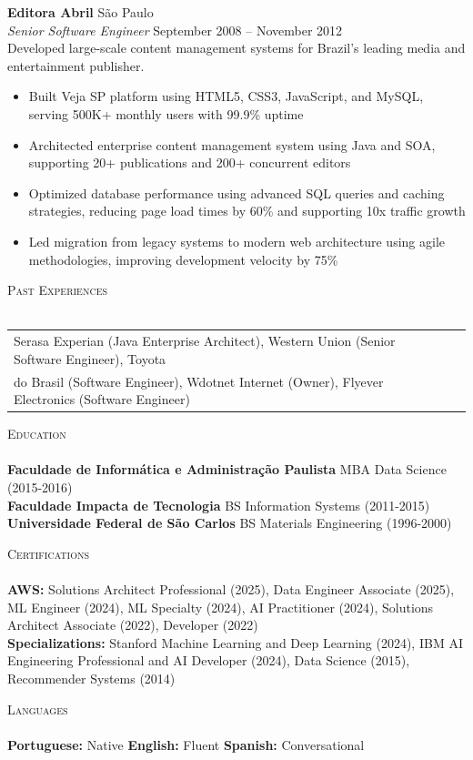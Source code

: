 \documentclass[a4paper]{article}
\newcommand{\lineunder} {
    \vspace*{-8pt} \\
    \hspace*{-18pt} \hrulefill \\
}
\newcommand{\header} [1] {
    {\hspace*{-18pt}\vspace*{6pt} \textsc{#1}}
    \vspace*{-6pt} \lineunder
}
\begin{document}
\textbf{Editora Abril} \hfill São Paulo\\
\textit{Senior Software Engineer} \hfill September 2008 – November 2012\\
\vspace{0.5mm}
Developed large-scale content management systems for Brazil's leading media and entertainment publisher.
\vspace{-2mm}
\begin{itemize}
\setlength\itemsep{-1mm}
\item Built Veja SP platform using HTML5, CSS3, JavaScript, and MySQL, serving 500K+ monthly users with 99.9\% uptime
\item Architected enterprise content management system using Java and SOA, supporting 20+ publications and 200+ concurrent editors
\item Optimized database performance using advanced SQL queries and caching strategies, reducing page load times by 60\% and supporting 10x traffic growth
\item Led migration from legacy systems to modern web architecture using agile methodologies, improving development velocity by 75\%
\end{itemize}
\vspace{0.5mm}

\header{Past Experiences}
\vspace{0.5mm}
\begin{tabular}{ @{}l l }
    Serasa Experian (Java Enterprise Architect), Western Union (Senior Software Engineer), Toyota \\ do Brasil (Software Engineer), Wdotnet Internet (Owner), Flyever Electronics (Software Engineer)
\end{tabular}
\vspace{1mm}

\header{Education}
\vspace{0.5mm}
\textbf{Faculdade de Informática e Administração Paulista} \hfill MBA Data Science (2015-2016) \\
\textbf{Faculdade Impacta de Tecnologia} \hfill BS Information Systems (2011-2015) \\
\textbf{Universidade Federal de São Carlos} \hfill BS Materials Engineering (1996-2000) \\
\vspace{1mm}

\header{Certifications}
\vspace{0.5mm}
\textbf{AWS:} Solutions Architect Professional (2025), Data Engineer Associate (2025), ML Engineer (2024), ML Specialty (2024), AI Practitioner (2024), Solutions Architect Associate (2022), Developer (2022) \\
\textbf{Specializations:} Stanford Machine Learning and Deep Learning (2024), IBM AI Engineering Professional and AI Developer (2024), Data Science (2015), Recommender Systems (2014) \\
\vspace{1mm}

\header{Languages}
\vspace{0.5mm}
\textbf{Portuguese:} Native \hfill \textbf{English:} Fluent \hfill \textbf{Spanish:} Conversational \\
\end{document}
